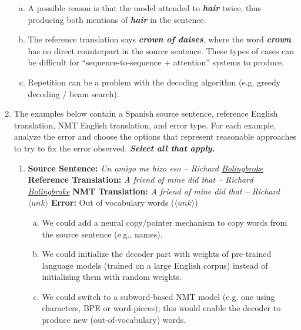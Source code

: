 \begin{enumerate}[1.]
\begin{enumerate}[(a)]
\item A possible reason is that the model attended to {\bf {\em hair}} twice, thus producing both mentions of {\bf {\em hair}} in the sentence.
\item The reference translation says {\bf {\em crown of daises}}, where the word {\bf {\em crown}} has no direct counterpart in the source sentence. These types of cases can be difficult for ``sequence-to-sequence + attention'' systems to produce.
\item Repetition can be a problem with the decoding algorithm (e.g. greedy decoding / beam search).
\end{enumerate}


\item
The examples below contain a Spanish source sentence, reference English translation, NMT English translation, and error type. For each example, analyze the error and choose the options that represent reasonable approaches to try to fix the error observed. {\bf {\em Select all that apply.}}

\begin{enumerate}[3a.]
\item {}

{\bf Source Sentence:} {\em Un amigo me hizo eso -- Richard \underline{Bolingbroke}}
\newline
{\bf Reference Translation:} {\em A friend of mine did that -- Richard \underline{Bolingbroke}}
\newline
{\bf NMT Translation:} {\em A friend of mine did that -- Richard $\langle unk \rangle$}
\newline 
{\bf Error:} Out of vocabulary words ($\langle unk \rangle$)
\newline

\begin{enumerate}[(a)]
\item We could add a neural copy/pointer mechanism to copy words from the source sentence (e.g., names).
\item We could initialize the decoder part with weights of pre-trained language models (trained on a large English corpus) instead of initializing them with random weights.
\item We could switch to a subword-based NMT model (e.g. one using characters, BPE or word-pieces); this would enable the decoder to produce new (out-of-vocabulary) words.
\end{enumerate}


\end{enumerate}
\end{enumerate}
